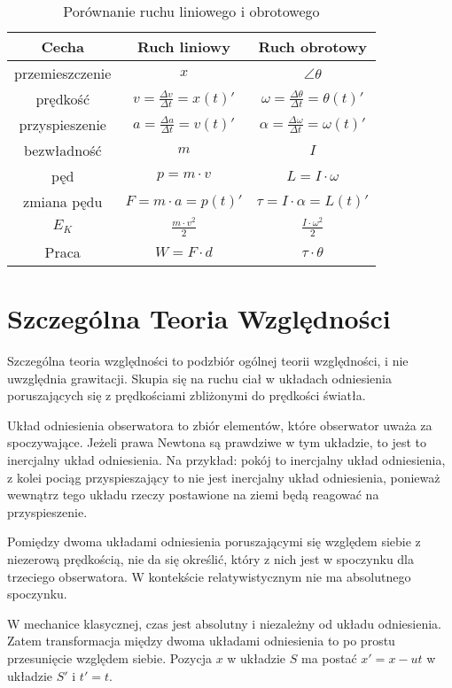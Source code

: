 \documentclass{../notatki}
\begin{document}
\begin{table*}[ht]
  \centering
  \begin{tabular}{c|c|c}
    Cecha & Ruch liniowy & Ruch obrotowy \\ \hline
    przemieszczenie & $x$ & $\angle \theta$ \\ \hline
    prędkość & $v = \frac{\Delta v}{\Delta t} = x(t)'$ & $\omega =
    \frac{\Delta \theta}{\Delta t} = \theta(t)'$ \\ \hline
    przyspieszenie & $a = \frac{\Delta a}{\Delta t} = v(t)'$ &
    $\alpha = \frac{\Delta \omega}{\Delta t} = \omega(t)'$ \\ \hline
    bezwładność & $m$ & $I$ \\ \hline
    pęd & $p = m \cdot v$ & $L = I \cdot \omega$ \\ \hline
    zmiana pędu & $F = m \cdot a = p(t)'$ & $\tau = I \cdot \alpha =
    L(t)'$ \\ \hline
    $E_K$ & $\frac{m \cdot v^2}{2}$ & $\frac{I \cdot \omega^2}{2}$ \\ \hline
    Praca & $W = F \cdot d$ & $\tau \cdot \theta$
  \end{tabular}
  \caption{Porównanie ruchu liniowego i obrotowego}
\end{table*}

\section{Szczególna Teoria Względności}

Szczególna teoria względności to podzbiór ogólnej teorii względności, i nie
uwzględnia grawitacji. Skupia się na ruchu ciał w układach odniesienia
poruszających się z prędkościami zbliżonymi do prędkości światła.

Układ odniesienia obserwatora to zbiór elementów, które obserwator uważa za
spoczywające. Jeżeli prawa Newtona są prawdziwe w tym układzie, to jest to
inercjalny układ odniesienia. Na przykład: pokój to inercjalny układ
odniesienia, z kolei pociąg przyspieszający to nie jest inercjalny układ
odniesienia, ponieważ wewnątrz tego układu rzeczy postawione na ziemi będą
reagować na przyspieszenie.

Pomiędzy dwoma układami odniesienia poruszającymi się względem siebie
z niezerową prędkością, nie da się określić, który z nich jest w spoczynku dla
trzeciego obserwatora. W kontekście relatywistycznym nie ma absolutnego
spoczynku.

W mechanice klasycznej, czas jest absolutny i niezależny od układu odniesienia.
Zatem transformacja między dwoma układami odniesienia to po prostu przesunięcie
względem siebie. Pozycja $x$ w układzie $S$ ma postać $x' = x - ut$ w
układzie $S'$ i $t' = t$.
\end{document}
